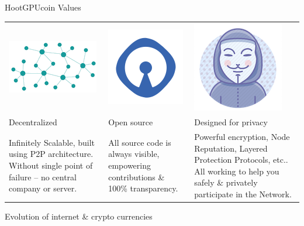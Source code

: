 \documentclass[10pt]{beamer}
\begin{document}
\begin{frame}[t]{HootGPUcoin Values}
\centering
\begin{adjustbox}{width=1\textwidth}
\begin{tabularx} {\textwidth}{|Y|Y|Y|}
 \hline
 \includegraphics[scale=0.3]{static/decentnew} & \includegraphics[scale=0.3]{static/opensource} & \includegraphics[scale=0.3]{static/privacy}\\ 
Decentralized & Open source & Designed for privacy\\
Infinitely Scalable, built using P2P architecture. Without single point of failure – no central company or server. & All source code is always visible, empowering contributions \& 100\% transparency. & Powerful encryption, Node Reputation, Layered Protection Protocols, etc.. All working to help you safely \& privately participate in the Network. \\
 \hline
\end{tabularx}
\end{adjustbox}

\end{frame}
 

\begin{frame}[t]{Evolution of internet \& crypto currencies}
 
 
\end{frame} 
 
\end{document}
